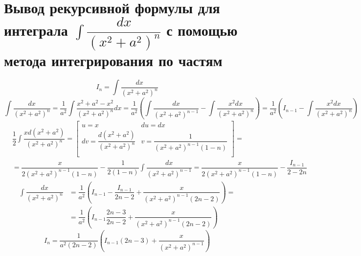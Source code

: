 \documentclass[12pt]{article}
\begin{document}
\section{Вывод рекурсивной формулы для интеграла $\int \dfrac{dx}{(x^2 + a^2)^n}$  с помощью метода интегрирования по частям}
\[
    I_n = \int \dfrac{dx}{(x^2 + a^2)^n}
\]
\[
    \int \dfrac{dx}{(x^2 + a^2)^n} = \dfrac{1}{a^2} \int \dfrac{x^2 + a^2 - x^2}{(x^2 + a^2)^n}dx
    = \dfrac{1}{a^2}\left(\int \dfrac{dx}{(x^2 + a^2)^{n-1}} - \int \dfrac{x^2dx}{(x^2 + a^2)^n}\right)
    = \dfrac{1}{a^2}\left(I_{n-1} - \int \dfrac{x^2dx}{(x^2 + a^2)^n}\right)
\]
\[
    \begin{aligned}
         & \dfrac{1}{2}\int \dfrac{xd(x^2 + a^2)}{(x^2 + a^2)^n} =
        \left[\begin{array}{ll}
                      u = x                                    & du = dx                                   \\
                      dv = \dfrac{d(x^2 + a^2)}{(x^2 + a^2)^n} & v = \dfrac{1}{(x^2 + a^2)^{n - 1}(1 - n)} \\
                  \end{array}\right] =                                        \\
         & = \dfrac{x}{2(x^2 + a^2)^{n-1}(1-n)} - \dfrac{1}{2(1 - n)}\int \dfrac{dx}{(x^2 + a^2)^{n - 1}} = \dfrac{x}{2(x^2 + a^2)^{n-1}(1-n)} - \dfrac{I_{n-1}}{2 - 2n}
    \end{aligned}
\]
\[
    \begin{aligned}
        \int \dfrac{dx}{(x^2 + a^2)^n} & = \dfrac{1}{a^2}\left(I_{n-1} - \dfrac{I_{n-1}}{2n-2} + \dfrac{x}{(x^2 + a^2)^{n-1}(2n-2)}\right) = \\
                                       & = \dfrac{1}{a^2}\left(I_{n-1}\dfrac{2n - 3}{2n - 2} + \dfrac{x}{(x^2 + a^2)^{n-1}(2n-2)}\right)
    \end{aligned}
\]
\[
    I_n = \dfrac{1}{a^2(2n - 2)}\left(I_{n-1}(2n - 3) + \dfrac{x}{(x^2 + a^2)^{n-1}}\right)
\]
\end{document}
